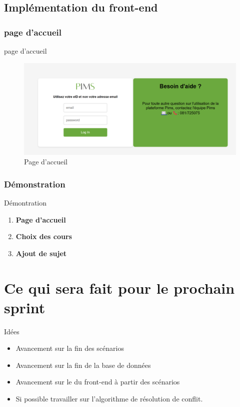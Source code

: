 \documentclass[numbering=fraction]{beamer}
\begin{document}
\subsection{Implémentation du front-end}
\subsubsection{page d'accueil}
\begin{frame}{page d'accueil}
    \begin{figure}[!ht]
        \centering
        \includegraphics[scale=0.5]{pageConnexion.png}
        \caption{Page d'accueil}
    \end{figure}
\end{frame}
\subsubsection{Démonstration}
\begin{frame}{Démontration}
    \begin{enumerate}
        \item \textbf{Page d'accueil}
        \item \textbf{Choix des cours}
        \item \textbf{Ajout de sujet}
    \end{enumerate}
\end{frame}
\section{Ce qui sera fait pour le prochain sprint}
\begin{frame}{Idées}
    \begin{itemize}
        \item Avancement sur la fin des scénarios
        \item Avancement sur la fin de la base de données
        \item Avancement sur le du front-end à partir des scénarios
        \item Si possible travailler sur l'algorithme de résolution de conflit.
    \end{itemize}
\end{frame}
\end{document}
